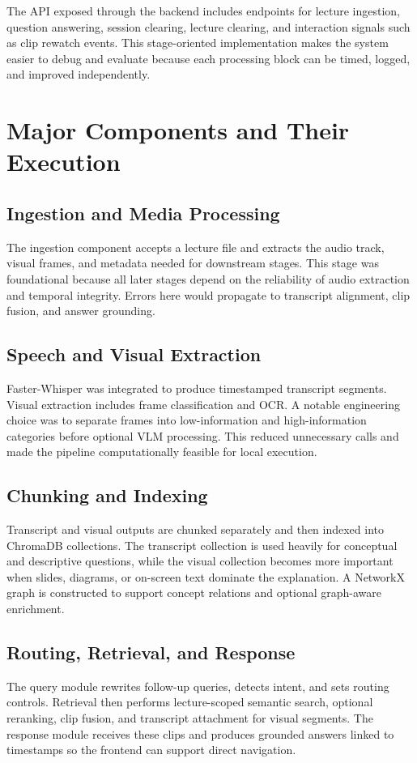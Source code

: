 \documentclass[12pt,a4paper,oneside]{report}
\begin{document}
The API exposed through the backend includes endpoints for lecture ingestion, question answering, session clearing, lecture clearing, and interaction signals such as clip rewatch events. This stage-oriented implementation makes the system easier to debug and evaluate because each processing block can be timed, logged, and improved independently.

\section{Major Components and Their Execution}
\subsection{Ingestion and Media Processing}
The ingestion component accepts a lecture file and extracts the audio track, visual frames, and metadata needed for downstream stages. This stage was foundational because all later stages depend on the reliability of audio extraction and temporal integrity. Errors here would propagate to transcript alignment, clip fusion, and answer grounding.

\subsection{Speech and Visual Extraction}
Faster-Whisper was integrated to produce timestamped transcript segments. Visual extraction includes frame classification and OCR. A notable engineering choice was to separate frames into low-information and high-information categories before optional VLM processing. This reduced unnecessary calls and made the pipeline computationally feasible for local execution.

\subsection{Chunking and Indexing}
Transcript and visual outputs are chunked separately and then indexed into ChromaDB collections. The transcript collection is used heavily for conceptual and descriptive questions, while the visual collection becomes more important when slides, diagrams, or on-screen text dominate the explanation. A NetworkX graph is constructed to support concept relations and optional graph-aware enrichment.

\subsection{Routing, Retrieval, and Response}
The query module rewrites follow-up queries, detects intent, and sets routing controls. Retrieval then performs lecture-scoped semantic search, optional reranking, clip fusion, and transcript attachment for visual segments. The response module receives these clips and produces grounded answers linked to timestamps so the frontend can support direct navigation.
\end{document}
